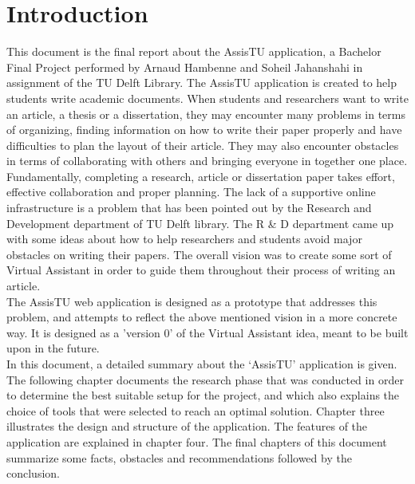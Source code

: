 \chapter{Introduction}

This document is the final report about the AssisTU application, a Bachelor Final Project performed by Arnaud Hambenne and Soheil Jahanshahi in
assignment of the TU Delft Library. 
The AssisTU application is created to help students write academic documents. When students and researchers want to write an article, a thesis or a 
dissertation, they may encounter many problems in terms of organizing, finding information on how to write their paper properly and have difficulties 
to plan the layout of their article. They may also encounter obstacles in terms of collaborating with others and bringing everyone in together one 
place. \\

Fundamentally, completing a research, article or dissertation paper takes effort, effective collaboration and proper planning. The lack of a supportive
online infrastructure is a problem that has been pointed out by the Research and Development department of TU Delft library. The R \& D department came 
up with some ideas about how to help researchers and students avoid major obstacles on writing their papers. The overall vision was to create some sort 
of Virtual Assistant in order to guide them throughout their process of writing an article.\\

The AssisTU web application is designed as a prototype that addresses this problem, and attempts to reflect the above mentioned vision in a more 
concrete way. It is designed as a 'version 0' of the Virtual Assistant idea, meant to be built upon in the future.\\ 

In this document, a detailed summary about the `AssisTU' application is given. The following chapter documents the research phase that was conducted in 
order to determine the best suitable setup for the project, and which also explains the choice of tools that were selected to reach an optimal solution. 
Chapter three illustrates the design and structure of the application. The features of the application are explained in chapter four. The final chapters 
of this document summarize some facts, obstacles and recommendations followed by the conclusion.  
